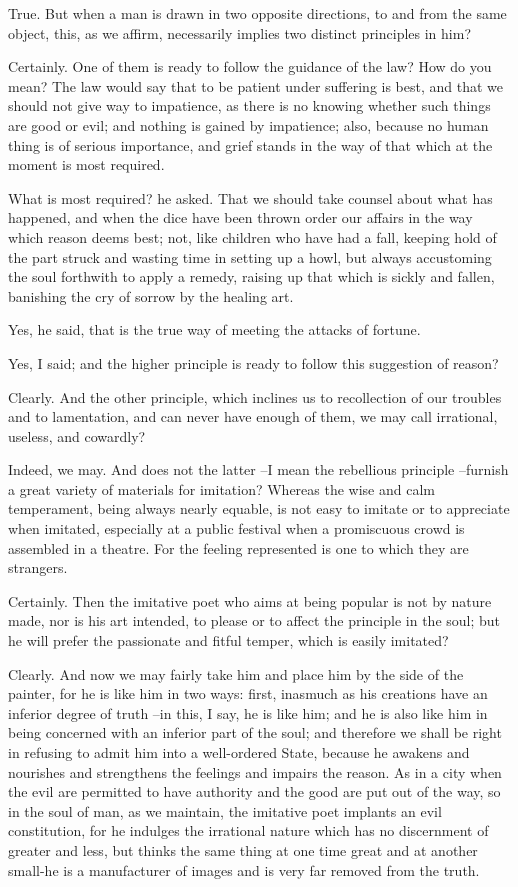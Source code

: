 True.
But when a man is drawn in two opposite directions, to and from the same object, this, as we affirm, necessarily implies two distinct principles in him?

Certainly.
One of them is ready to follow the guidance of the law?
How do you mean?
The law would say that to be patient under suffering is best, and that we should not give way to impatience, as there is no knowing whether such things are good or evil; and nothing is gained by impatience; also, because no human thing is of serious importance, and grief stands in the way of that which at the moment is most required.

What is most required? he asked.
That we should take counsel about what has happened, and when the dice have been thrown order our affairs in the way which reason deems best; not, like children who have had a fall, keeping hold of the part struck and wasting time in setting up a howl, but always accustoming the soul forthwith to apply a remedy, raising up that which is sickly and fallen, banishing the cry of sorrow by the healing art.

Yes, he said, that is the true way of meeting the attacks of fortune.

Yes, I said; and the higher principle is ready to follow this suggestion of reason?

Clearly.
And the other principle, which inclines us to recollection of our troubles and to lamentation, and can never have enough of them, we may call irrational, useless, and cowardly?

Indeed, we may.
And does not the latter --I mean the rebellious principle --furnish a great variety of materials for imitation? Whereas the wise and calm temperament, being always nearly equable, is not easy to imitate or to appreciate when imitated, especially at a public festival when a promiscuous crowd is assembled in a theatre. For the feeling represented is one to which they are strangers.

Certainly.
Then the imitative poet who aims at being popular is not by nature made, nor is his art intended, to please or to affect the principle in the soul; but he will prefer the passionate and fitful temper, which is easily imitated?

Clearly.
And now we may fairly take him and place him by the side of the painter, for he is like him in two ways: first, inasmuch as his creations have an inferior degree of truth --in this, I say, he is like him; and he is also like him in being concerned with an inferior part of the soul; and therefore we shall be right in refusing to admit him into a well-ordered State, because he awakens and nourishes and strengthens the feelings and impairs the reason. As in a city when the evil are permitted to have authority and the good are put out of the way, so in the soul of man, as we maintain, the imitative poet implants an evil constitution, for he indulges the irrational nature which has no discernment of greater and less, but thinks the same thing at one time great and at another small-he is a manufacturer of images and is very far removed from the truth.

